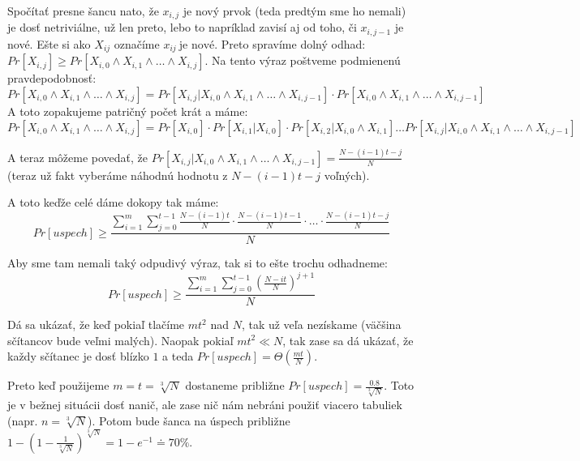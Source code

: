Spočítať presne šancu nato, že $x_{i,j}$ je nový prvok 
(teda predtým sme ho nemali) je dosť netriviálne,
už len preto, lebo to napríklad zavisí aj od toho, či $x_{i,j-1}$ je nové.
Ešte si ako $X_{ij}$ označíme $x_{ij} ~\text{je nové}$.
Preto spravíme dolný odhad:
$Pr[X_{i,j}] \geq Pr[X_{i,0}\land X_{i,1} \land \dots \land X_{i,j}]$.
Na tento výraz poštveme podmienenú pravdepodobnosť:
\begin{equation*}
    Pr[X_{i,0} \land X_{i,1} \land \dots \land X_{i,j}] = 
    Pr[X_{i,j} | X_{i,0} \land X_{i,1} \land \dots \land X_{i,j-1} ]
    \cdot
    Pr[X_{i,0} \land X_{i,1} \land \dots \land X_{i,j-1} ]
\end{equation*}
A toto zopakujeme patričný počet krát a máme:
\begin{equation*}
    Pr[X_{i,0} \land X_{i,1} \land \dots \land X_{i,j}] =
    Pr[X_{i,0}] \cdot Pr[X_{i,1} | X_{i,0}] 
    \cdot Pr[X_{i,2} | X_{i,0} \land X_{i,1}] \dots
    Pr[X_{i,j} | X_{i,0} \land X_{i,1} \land \dots \land X_{i,j-1}]
\end{equation*}

A teraz môžeme povedať, že
$Pr[X_{i,j} | X_{i,0} \land X_{i,1} \land \dots \land X_{i,j-1}] =
    \frac{N - (i-1)t - j}{N}$
(teraz už fakt vyberáme náhodnú hodnotu z $N - (i-1)t - j$ voľných). 

A toto keďže celé dáme dokopy tak máme:
\begin{equation*}
    Pr[uspech] \geq \frac{\displaystyle
        \sum_{i=1}^m \sum_{j=0}^{t-1}
            \frac{N - (i-1)t}{N} \cdot \frac{N - (i-1)t - 1}{N} \cdot \dots
            \cdot \frac{N - (i-1)t - j}{N}
        }{N}
\end{equation*}

Aby sme tam nemali taký odpudivý výraz, tak si to ešte trochu odhadneme:
\begin{equation*}
    Pr[uspech] \geq \frac{\displaystyle
        \sum_{i=1}^m \sum_{j=0}^{t-1} \left ( \frac{N - it}{N} \right )^{j+1}
        }{N}
\end{equation*}

Dá sa ukázať, že keď pokiaľ tlačíme $mt^2$ nad $N$, tak už veľa nezískame
(väčšina sčítancov bude veľmi malých).
Naopak pokiaľ $mt^2 \ll N$, tak zase sa dá ukázať,
že každy sčítanec je dosť blízko $1$ a teda 
$Pr[uspech] = \Theta\left(\frac{mt}{N}\right)$.

Preto keď použijeme $m=t=\sqrt[3]{N}$ dostaneme približne 
$Pr[uspech] = \frac{0.8}{\sqrt[3]{N}}$.
Toto je v bežnej situácii dosť nanič, ale zase nič nám nebráni
použiť viacero tabuliek (napr. $n = \sqrt[3]{N}$).
Potom bude šanca na úspech približne
$1 - (1 - \frac{1}{\sqrt[3]{N}})^{\sqrt[3]{N}} = 1-e^{-1} \doteq 70\%$.
